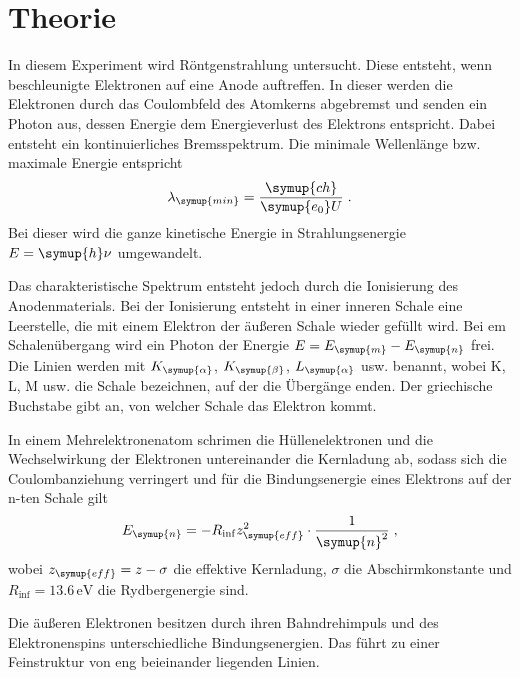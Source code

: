 \section{Theorie}
\label{sec:Theorie}

In diesem Experiment wird Röntgenstrahlung untersucht. Diese entsteht, wenn beschleunigte Elektronen
auf eine Anode auftreffen. In dieser werden die Elektronen durch das Coulombfeld des Atomkerns abgebremst und 
senden ein Photon aus, dessen Energie dem Energieverlust des Elektrons entspricht. Dabei entsteht ein 
kontinuierliches Bremsspektrum. Die minimale Wellenlänge bzw. maximale Energie entspricht 
\begin{equation*}
    \lambda_{\symup{min}} = \frac{\symup{ch}}{\symup{e_0}U} \; .
\end{equation*}
Bei dieser wird die ganze kinetische Energie in Strahlungsenergie $E = \symup{h}\nu$ umgewandelt.

Das charakteristische Spektrum entsteht jedoch durch die Ionisierung des Anodenmaterials. Bei der Ionisierung 
entsteht in einer inneren Schale eine Leerstelle, die mit einem Elektron der äußeren Schale wieder gefüllt wird.
Bei em Schalenübergang wird ein Photon der Energie $E = E_{\symup{m}} - E_{\symup{n}}$ frei. Die Linien werden 
mit $K_{\symup{\alpha}}$, $K_{\symup{\beta}}$, $L_{\symup{\alpha}}$ usw. benannt, wobei K, L, M usw. die 
Schale bezeichnen, auf der die Übergänge enden. Der griechische Buchstabe gibt an, von welcher Schale 
das Elektron kommt.

In einem Mehrelektronenatom schrimen die Hüllenelektronen und die Wechselwirkung der Elektronen untereinander 
die Kernladung ab, sodass sich die Coulombanziehung verringert und für die Bindungsenergie eines Elektrons 
auf der n-ten Schale gilt 
\begin{equation*}
    E_{\symup{n}} = - R_{\inf}z_{\symup{eff}}^2 \cdot \frac{1}{\symup{n}^2} \;  ,
\end{equation*}
wobei $z_{\symup{eff}} = z - \sigma$ die effektive Kernladung, $\sigma$ die Abschirmkonstante und $R_{\inf} = 13.6 \, \unit{\eV}$
die Rydbergenergie sind.

Die äußeren Elektronen besitzen durch ihren Bahndrehimpuls und des Elektronenspins unterschiedliche Bindungsenergien.
Das führt zu einer Feinstruktur von eng beieinander liegenden Linien.

